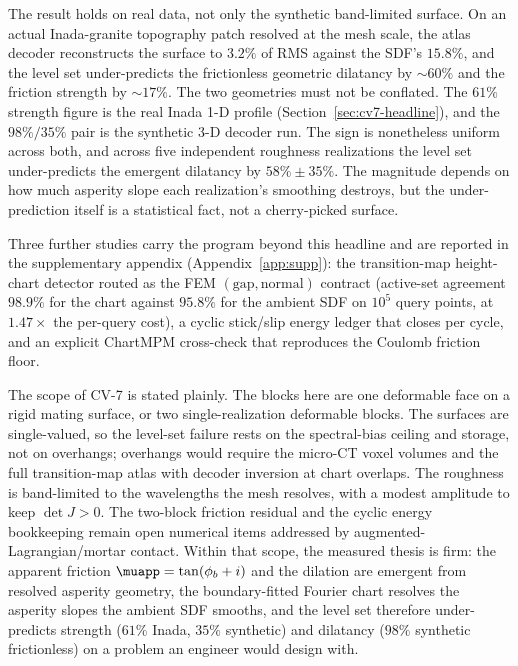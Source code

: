The result holds on real data, not only the synthetic band-limited surface. On an actual Inada-granite topography patch resolved at the mesh scale, the atlas decoder reconstructs the surface to $3.2\%$ of RMS against the SDF's $15.8\%$, and the level set under-predicts the frictionless geometric dilatancy by $\sim60\%$ and the friction strength by $\sim17\%$. The two geometries must not be conflated. The $61\%$ strength figure is the real Inada 1-D profile (Section~\ref{sec:cv7-headline}), and the $98\%/35\%$ pair is the synthetic 3-D decoder run. The sign is nonetheless uniform across both, and across five independent roughness realizations the level set under-predicts the emergent dilatancy by $58\%\pm35\%$. The magnitude depends on how much asperity slope each realization's smoothing destroys, but the under-prediction itself is a statistical fact, not a cherry-picked surface.

Three further studies carry the program beyond this headline and are reported in the supplementary appendix (Appendix~\ref{app:supp}): the transition-map height-chart detector routed as the FEM $(\text{gap},\text{normal})$ contract (active-set agreement $98.9\%$ for the chart against $95.8\%$ for the ambient SDF on $10^5$ query points, at $1.47\times$ the per-query cost), a cyclic stick/slip energy ledger that closes per cycle, and an explicit ChartMPM cross-check that reproduces the Coulomb friction floor.

The scope of CV-7 is stated plainly. The blocks here are one deformable face on a rigid mating surface, or two single-realization deformable blocks. The surfaces are single-valued, so the level-set failure rests on the spectral-bias ceiling and storage, not on overhangs; overhangs would require the micro-CT voxel volumes and the full transition-map atlas with decoder inversion at chart overlaps. The roughness is band-limited to the wavelengths the mesh resolves, with a modest amplitude to keep $\det J>0$. The two-block friction residual and the cyclic energy bookkeeping remain open numerical items addressed by augmented-Lagrangian/mortar contact. Within that scope, the measured thesis is firm: the apparent friction $\muapp=\tan(\phi_b+i)$ and the dilation are emergent from resolved asperity geometry, the boundary-fitted Fourier chart resolves the asperity slopes the ambient SDF smooths, and the level set therefore under-predicts strength ($61\%$ Inada, $35\%$ synthetic) and dilatancy ($98\%$ synthetic frictionless) on a problem an engineer would design with.
